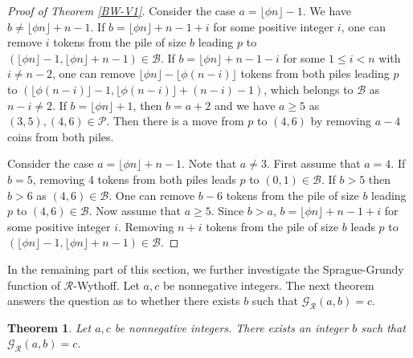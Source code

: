 \documentclass[12pt]{amsart}
\theoremstyle{plain}
\newtheorem{theorem}[proposition]{Theorem}
\theoremstyle{definition}
\theoremstyle{remark}
\begin{document}
\begin{proof}[Proof of Theorem \ref{BW-V1}]
Consider the case $a = \lfloor \phi n \rfloor - 1$. We have $b \neq \lfloor \phi n \rfloor + n - 1$. If $b = \lfloor \phi n \rfloor + n - 1 + i$ for some positive integer $i$, one can remove $i$ tokens from the pile of size $b$ leading $p$ to $(\lfloor \phi n \rfloor - 1, \lfloor \phi n \rfloor + n - 1) \in {\mathcal{B}}$. If $b = \lfloor \phi n \rfloor + n - 1-i$ for some $1 \leq i < n$ with $i\not=n-2$, one can remove $\lfloor \phi n \rfloor - \lfloor \phi (n-i) \rfloor$ tokens from both piles leading $p$ to $(\lfloor \phi (n-i) \rfloor - 1, \lfloor \phi (n-i) \rfloor +(n-i)-1)$, which belongs to ${\mathcal{B}}$ as $n-i\not=2$. If $b = \lfloor \phi n \rfloor + 1$, then $b=a+2$ and we have $a \geq 5$ as $(3,5) , (4,6) \in {\mathcal{P}}$. Then there is a move from $p$ to $(4,6)$ by removing $a-4$ coins from both piles.

Consider the case $a = \lfloor \phi n \rfloor + n - 1$. Note that $a \neq 3$. First assume that $a = 4$. If $b = 5$, removing 4 tokens from both piles leads $p$ to $(0,1) \in {\mathcal{B}}$. If $b > 5$ then $b > 6$ as $(4,6) \in {\mathcal{B}}$. One can remove $b-6$ tokens from the pile of size $b$ leading $p$ to $(4,6) \in {\mathcal{B}}$. Now assume that $a \geq 5$. Since $b > a$, $b = \lfloor \phi n \rfloor + n - 1 + i$ for some positive integer $i$. Removing $n+i$ tokens from the pile of size $b$ leads $p$ to $(\lfloor \phi n \rfloor - 1, \lfloor \phi n \rfloor + n - 1) \in {\mathcal{B}}$.
\end{proof}

In the remaining part of this section, we further  investigate the Sprague-Grundy function of ${\mathcal{R}}$-Wythoff. Let $a, c$ be nonnegative integers. The next theorem answers the question as to whether there exists $b$ such that ${\mathcal{G}}_{\mathcal{R}}(a,b) = c$.

\smallskip
\begin{theorem} \label{BW-Row}
Let $a, c$ be nonnegative integers. There exists an integer $b$ such that ${\mathcal{G}}_{\mathcal{R}}(a,b) = c$.
\end{theorem}
\end{document}
